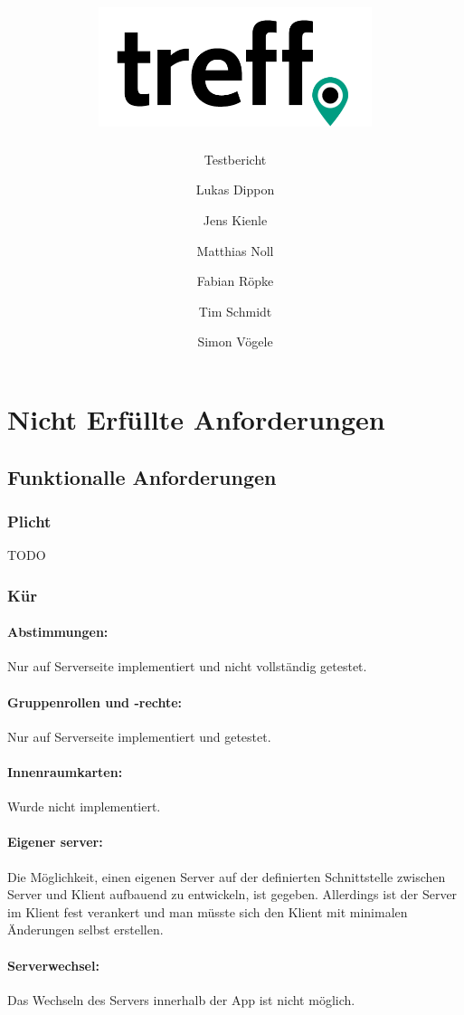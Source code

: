 \documentclass[parskip=full,11pt]{scrartcl}
\title{\includegraphics[width = 80mm]{images/logo_crop.png}}
\subtitle{\huge Testbericht}
\author{Lukas Dippon
        \and Jens Kienle
        \and Matthias Noll
        \and Fabian Röpke
        \and Tim Schmidt
        \and Simon Vögele}
\begin{document}
\maketitle
\thispagestyle{empty} %

\pagebreak
\tableofcontents

\pagebreak
\section{Nicht Erfüllte Anforderungen}
\subsection{Funktionalle Anforderungen}
\subsubsection{Plicht}
TODO
\subsubsection{Kür}
\paragraph{Abstimmungen:}
Nur auf Serverseite implementiert und nicht vollständig getestet.

\paragraph{Gruppenrollen und -rechte:}
Nur auf Serverseite implementiert und getestet.

\paragraph{Innenraumkarten:}
Wurde nicht implementiert.

\paragraph{Eigener server:}
Die Möglichkeit, einen eigenen Server auf der definierten Schnittstelle zwischen
Server und Klient aufbauend zu entwickeln, ist gegeben. Allerdings ist der
Server im Klient fest verankert und man müsste sich den Klient mit minimalen
Änderungen selbst erstellen.

\paragraph{Serverwechsel:}
Das Wechseln des Servers innerhalb der App ist nicht möglich.
\end{document}
